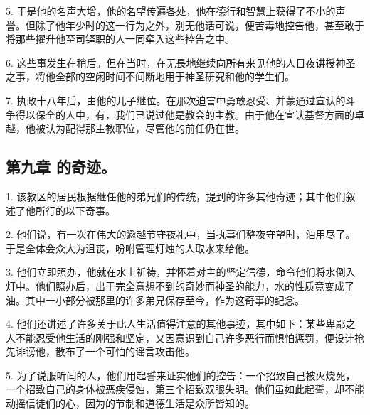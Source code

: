 5. 于是他的名声大增，他的名望传遍各处，他在德行和智慧上获得了不小的声誉。但除了他年少时的这一行为之外，别无他话可说，便苦毒地控告他，甚至敢于将那些擢升他至司铎职的人一同牵入这些控告之中。\par

6. 这些事发生在稍后。但在当时，在无畏地继续向所有来见他的人日夜讲授神圣之事，将他全部的空闲时间不间断地用于神圣研究和他的学生们。\par

7. 执政十八年后，由他的儿子继位。在那次迫害中勇敢忍受、并蒙通过宣认的斗争得以保全的人中，有，我们已说过他是教会的主教。由于他在宣认基督方面的卓越，他被认为配得那主教职位，尽管他的前任仍在世。\par


\subsection{第九章 的奇迹。}

1. 该教区的居民根据继任他的弟兄们的传统，提到的许多其他奇迹；其中他们叙述了他所行的以下奇事。\par

2. 他们说，有一次在伟大的逾越节守夜礼中，当执事们整夜守望时，油用尽了。于是全体会众大为沮丧，吩咐管理灯烛的人取水来给他。\par

3. 他们立即照办，他就在水上祈祷，并怀着对主的坚定信德，命令他们将水倒入灯中。他们照办后，出于完全意想不到的奇妙而神圣的能力，水的性质竟变成了油。其中一小部分被那里的许多弟兄保存至今，作为这奇事的纪念。\par

4. 他们还讲述了许多关于此人生活值得注意的其他事迹，其中如下：某些卑鄙之人不能忍受他生活的刚强和坚定，又因意识到自己许多恶行而惧怕惩罚，便设计抢先诽谤他，散布了一个可怕的谣言攻击他。\par

5. 为了说服听闻的人，他们用起誓来证实他们的控告：一个招致自己被火烧死，一个招致自己的身体被恶疾侵蚀，第三个招致双眼失明。他们虽如此起誓，却不能动摇信徒们的心，因为的节制和道德生活是众所皆知的。\par

